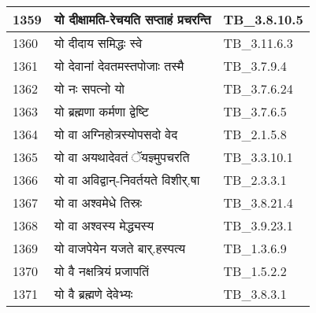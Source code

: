 \documentclass[17pt]{extarticle}
\begin{document}
\begin{longtable}{||p{0.4in}||p{4.9in}||p{0.9in}||}
    \hline
        
    1359 & यो दीक्षामति{-}रेचयति सप्ताहं प्रचरन्ति & TB\_3.8.10.5       \\
    
    \hline
        
    1360 & यो दीदाय समिद्धः स्वे & TB\_3.11.6.3       \\
    
    \hline
        
    1361 & यो देवानां देवतमस्तपोजाः तस्मै & TB\_3.7.9.4       \\
    
    \hline
        
    1362 & यो नः सपत्नो यो & TB\_3.7.6.24       \\
    
    \hline
        
    1363 & यो ब्रह्मणा कर्मणा द्वेष्टि & TB\_3.7.6.5       \\
    
    \hline
        
    1364 & यो वा अग्निहोत्रस्योपसदो वेद & TB\_2.1.5.8       \\
    
    \hline
        
    1365 & यो वा अयथादेवतं ॅयज्ञ्मुपचरति & TB\_3.3.10.1       \\
    
    \hline
        
    1366 & यो वा अविद्वान्{-}निवर्तयते विशीर्.षा & TB\_2.3.3.1       \\
    
    \hline
        
    1367 & यो वा अश्वमेधे तिस्रः & TB\_3.8.21.4       \\
    
    \hline
        
    1368 & यो वा अश्वस्य मेद्ध्यस्य & TB\_3.9.23.1       \\
    
    \hline
        
    1369 & यो वाजपेयेन यजते बार्.हस्पत्य & TB\_1.3.6.9       \\
    
    \hline
        
    1370 & यो वै नक्षत्रियं प्रजापतिं & TB\_1.5.2.2       \\
    
    \hline
        
    1371 & यो वै ब्रह्मणे देवेभ्यः & TB\_3.8.3.1       \\
    

\end{longtable}
\end{document}
